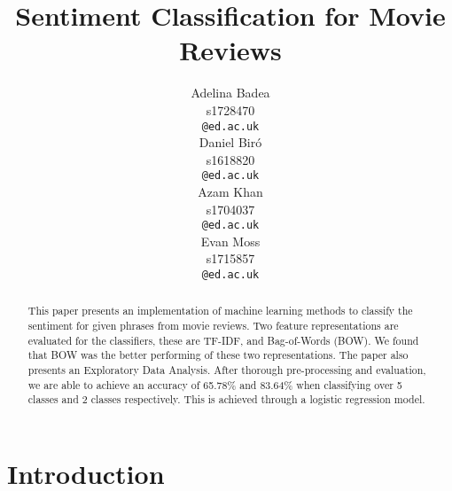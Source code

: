 \documentclass{article}
\title{Sentiment Classification for Movie Reviews}
\author{
  Adelina Badea\\
  s1728470\\
  \texttt{@ed.ac.uk} \\
  \And
  Daniel Biró\\
  s1618820\\
  \texttt{@ed.ac.uk} \\
 \And
  Azam Khan\\
  s1704037\\
  \texttt{@ed.ac.uk} \\
 \And
  Evan Moss\\
  s1715857\\
  \texttt{@ed.ac.uk}\\
}
\begin{document}
\maketitle

\begin{abstract}
This paper presents an implementation of machine learning methods to classify the sentiment for given phrases from movie reviews. Two feature representations are evaluated for the classifiers, these are TF-IDF, and Bag-of-Words (BOW). We found that BOW was the better performing of these two representations. The paper also presents an Exploratory Data Analysis. After thorough pre-processing and evaluation, we are able to achieve an accuracy of 65.78\% and 83.64\% when classifying over 5 classes and 2 classes respectively. This is achieved through a logistic regression model.
\end{abstract}





\section{Introduction}
\end{document}
